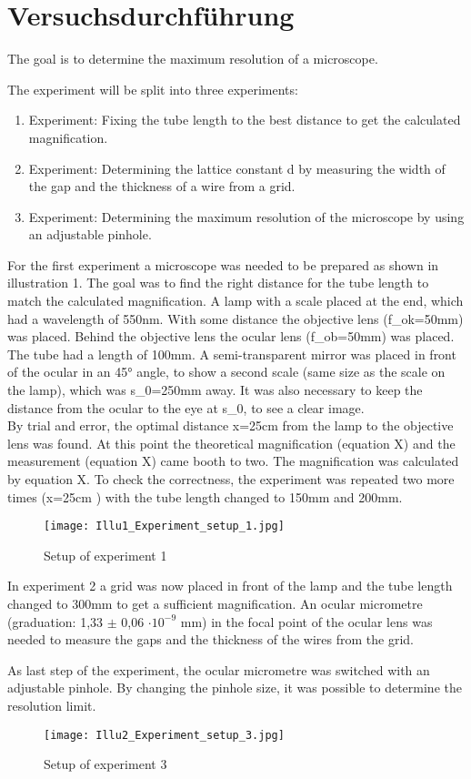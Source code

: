 \section{Versuchsdurchführung}

The goal is to determine the maximum resolution of a microscope.

The experiment will be split into three experiments:

\begin{enumerate}
	\item{Experiment: Fixing the tube length to the best distance to get the calculated magnification.}
	\item{Experiment: Determining the lattice constant d by measuring the width of the gap and the thickness of a wire from a grid.}
	\item{Experiment: Determining the maximum resolution of the microscope by using an adjustable pinhole.}
\end{enumerate}

For the first experiment a microscope was needed to be prepared as shown in illustration 1.  The goal was to find the right distance for the tube length to match the calculated magnification. A lamp with a scale placed at the end, which had a wavelength of 550nm. With some distance the objective lens (f\_ok=50mm) was placed. Behind the objective lens the ocular lens (f\_ob=50mm) was placed. The tube had a length of 100mm. A semi-transparent mirror was placed in front of the ocular in an 45° angle, to show a second scale (same size as the scale on the lamp), which was s\_0=250mm away. It was also necessary to keep the distance from the ocular to the eye at s\_0, to see a clear image.
\\
By trial and error, the optimal distance x=25cm from the lamp to the objective lens was found. At this point the theoretical magnification (equation X) and the measurement (equation X) came booth to two. The magnification was calculated by equation X. To check the correctness, the experiment was repeated two more times (x=25cm ) with the tube length changed to 150mm and 200mm.

\begin{figure}[h!]
    \centering
  \texttt{[image: Illu1\_Experiment\_setup\_1.jpg]}
  \caption{Setup of experiment 1}
\end{figure}

In experiment 2 a grid was now placed in front of the lamp and the tube length changed to 300mm to get a sufficient magnification. An ocular micrometre (graduation: 1,33 $\pm$ 0,06 $\cdot10^{-9}$ mm) in the focal point of the ocular lens was needed to measure the gaps and the thickness of the wires from the grid.

As last step of the experiment, the ocular micrometre was switched with an adjustable pinhole. By changing the pinhole size, it was possible to determine the resolution limit.

\begin{figure}[h!]
    \centering
  \texttt{[image: Illu2\_Experiment\_setup\_3.jpg]}
  \caption{Setup of experiment 3}
\end{figure}

\newpage
